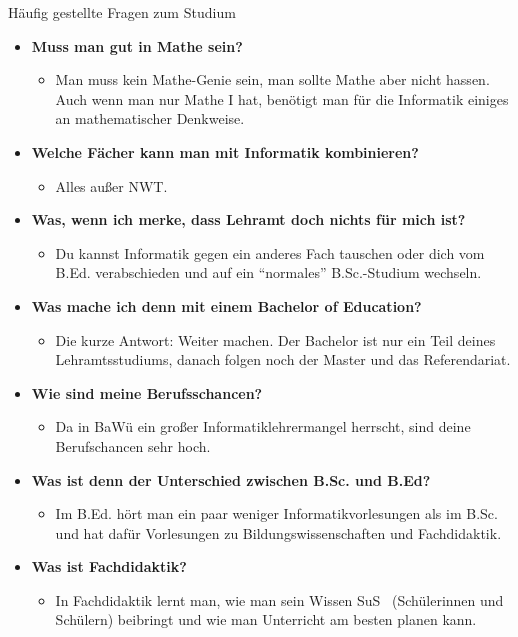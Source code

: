 \begin{block}{Häufig gestellte Fragen zum Studium}
\begin{large}
\begin{itemize}
\item \textbf{Muss man gut in Mathe sein?}
\begin{itemize}
	\item Man muss kein Mathe-Genie sein, man sollte Mathe aber nicht hassen. Auch wenn man nur Mathe I hat, benötigt man für die Informatik einiges an mathematischer Denkweise.
\end{itemize}
\item \textbf{Welche Fächer kann man mit Informatik kombinieren?}
\begin{itemize}
	\item Alles außer NWT.
\end{itemize}
\item \textbf{Was, wenn ich merke, dass Lehramt doch nichts für mich ist?} 
\begin{itemize}
	\item Du kannst Informatik gegen ein anderes Fach tauschen oder dich vom B.Ed. verabschieden und auf ein "`normales"' B.Sc.-Studium wechseln.
\end{itemize}
\item \textbf{Was mache ich denn mit einem Bachelor of Education?} 
\begin{itemize}
	\item Die kurze Antwort: Weiter machen. Der Bachelor ist nur ein Teil deines Lehramtsstudiums, danach folgen noch der Master und das Referendariat.
\end{itemize}
\item \textbf{Wie sind meine Berufsschancen?} 
\begin{itemize}
	\item Da in BaWü ein großer Informatiklehrermangel herrscht, sind deine Berufschancen sehr hoch.
\end{itemize}
\item \textbf{Was ist denn der Unterschied zwischen B.Sc. und B.Ed?} 
\begin{itemize}
	\item Im B.Ed. hört man ein paar weniger Informatikvorlesungen als im B.Sc. und hat dafür Vorlesungen zu Bildungswissenschaften und Fachdidaktik.
\end{itemize}
\item \textbf{Was ist Fachdidaktik?} 
\begin{itemize}
	\item In Fachdidaktik lernt man, wie man sein Wissen SuS~ (Schülerinnen und Schülern) beibringt und wie man Unterricht am besten planen kann.
\end{itemize}


\end{itemize}
\end{large}
\end{block}

